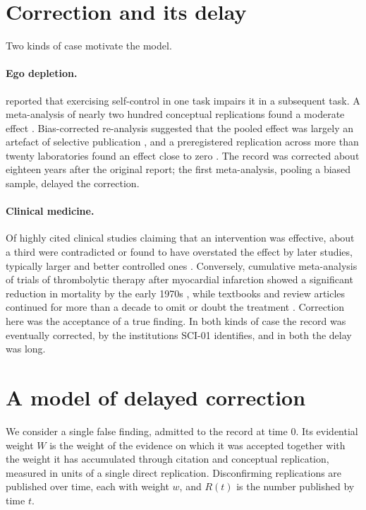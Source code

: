 \documentclass{situationist-preprint}
\begin{document}
\section{Correction and its delay}

Two kinds of case motivate the model.

\paragraph{Ego depletion.} \citet{Baumeister1998} reported that exercising self-control in one task impairs it in a subsequent task. A meta-analysis of nearly two hundred conceptual replications found a moderate effect \citep{Hagger2010}. Bias-corrected re-analysis suggested that the pooled effect was largely an artefact of selective publication \citep{CarterMcCullough2014}, and a preregistered replication across more than twenty laboratories found an effect close to zero \citep{Hagger2016}. The record was corrected about eighteen years after the original report; the first meta-analysis, pooling a biased sample, delayed the correction.

\paragraph{Clinical medicine.} Of highly cited clinical studies claiming that an intervention was effective, about a third were contradicted or found to have overstated the effect by later studies, typically larger and better controlled ones \citep{Ioannidis2005}. Conversely, cumulative meta-analysis of trials of thrombolytic therapy after myocardial infarction showed a significant reduction in mortality by the early 1970s \citep{Lau1992}, while textbooks and review articles continued for more than a decade to omit or doubt the treatment \citep{Antman1992}. Correction here was the acceptance of a true finding. In both kinds of case the record was eventually corrected, by the institutions SCI-01 identifies, and in both the delay was long.

\section{A model of delayed correction}

We consider a single false finding, admitted to the record at time $0$. Its evidential weight $W$ is the weight of the evidence on which it was accepted together with the weight it has accumulated through citation and conceptual replication, measured in units of a single direct replication. Disconfirming replications are published over time, each with weight $w$, and $R(t)$ is the number published by time $t$.
\end{document}

